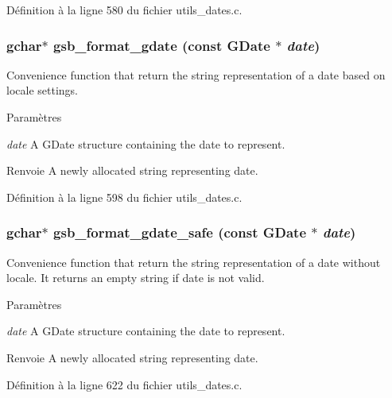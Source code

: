 Définition à la ligne 580 du fichier utils\_\-dates.c.

\subsubsection[{gsb\_\-format\_\-gdate}]{\setlength{\rightskip}{0pt plus 5cm}gchar$\ast$ gsb\_\-format\_\-gdate (const GDate $\ast$ {\em date})}\label{utils__dates_8c_a6e7537390d7569da5efc74f96ea57da7}
Convenience function that return the string representation of a date based on locale settings.


\begin{DoxyParams}{Paramètres}
\item[{\em date}]A GDate structure containing the date to represent.\end{DoxyParams}
\begin{DoxyReturn}{Renvoie}
A newly allocated string representing date. 
\end{DoxyReturn}


Définition à la ligne 598 du fichier utils\_\-dates.c.

\subsubsection[{gsb\_\-format\_\-gdate\_\-safe}]{\setlength{\rightskip}{0pt plus 5cm}gchar$\ast$ gsb\_\-format\_\-gdate\_\-safe (const GDate $\ast$ {\em date})}\label{utils__dates_8c_abe508780ddee49c70a49b509e731bb27}
Convenience function that return the string representation of a date without locale. It returns an empty string if date is not valid.


\begin{DoxyParams}{Paramètres}
\item[{\em date}]A GDate structure containing the date to represent.\end{DoxyParams}
\begin{DoxyReturn}{Renvoie}
A newly allocated string representing date. 
\end{DoxyReturn}


Définition à la ligne 622 du fichier utils\_\-dates.c.

